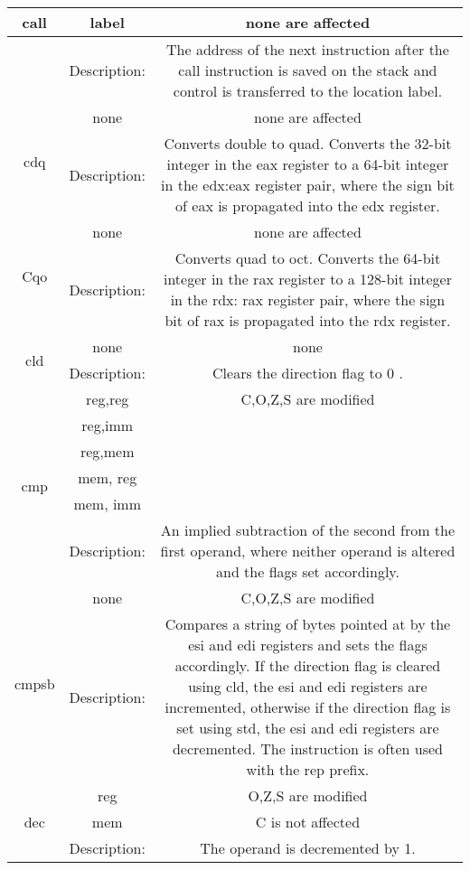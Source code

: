 \documentclass[10pt]{article}
\begin{document}
\begin{center}
\begin{tabular}{|c|c|c|}
\hline
\multirow[t]{2}{*}{call} & label & none are affected \\
\hline
 & Description: & The address of the next instruction after the call instruction is saved on the stack and control is transferred to the location label. \\
\hline
\multirow[t]{2}{*}{cdq} & none & none are affected \\
\hline
 & Description: & Converts double to quad. Converts the 32-bit integer in the eax register to a 64-bit integer in the edx:eax register pair, where the sign bit of eax is propagated into the edx register. \\
\hline
\multirow[t]{2}{*}{Cqo} & none & none are affected \\
\hline
 & Description: & Converts quad to oct. Converts the 64-bit integer in the rax register to a 128-bit integer in the rdx: rax register pair, where the sign bit of rax is propagated into the rdx register. \\
\hline
\multirow[t]{2}{*}{cld} & none & none \\
\hline
 & Description: & Clears the direction flag to 0 . \\
\hline
\multirow[t]{6}{*}{cmp} & reg,reg & C,O,Z,S are modified \\
\hline
 & reg,imm &  \\
\hline
 & reg,mem &  \\
\hline
 & mem, reg &  \\
\hline
 & mem, imm &  \\
\hline
 & Description: & An implied subtraction of the second from the first operand, where neither operand is altered and the flags set accordingly. \\
\hline
\multirow[t]{2}{*}{cmpsb} & none & C,O,Z,S are modified \\
\hline
 & Description: & Compares a string of bytes pointed at by the esi and edi registers and sets the flags accordingly. If the direction flag is cleared using cld, the esi and edi registers are incremented, otherwise if the direction flag is set using std, the esi and edi registers are decremented. The instruction is often used with the rep prefix. \\
\hline
\multirow[t]{3}{*}{dec} & reg & O,Z,S are modified \\
\hline
 & mem & C is not affected \\
\hline
 & Description: & The operand is decremented by 1. \\
\hline
\end{tabular}
\end{center}
\end{document}
